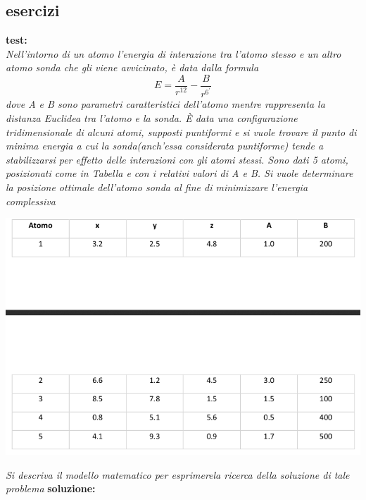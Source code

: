 \message{ !name(ro.tex)}\documentclass[a4paper,12pt, oneside]{book}
\begin{document}
\subsection{esercizi}
\begin{esempio}
  \textbf{test:}\\
  \textit{Nell’intorno di un atomo l’energia di interazione tra
    l’atomo stesso e un altro atomo sonda che gli viene avvicinato, è
    data dalla formula}
  \[E=\frac{A}{r^{12}}-\frac{B}{r^{6^{'}}}\]
  \textit{dove A e B sono parametri caratteristici dell’atomo mentre
    rappresenta la distanza Euclidea tra l’atomo e la sonda. È data
    una  configurazione  tridimensionale  di  alcuni  atomi,  supposti
    puntiformi  e  si  vuole  trovare  il  punto  di  minima energia
    a  cui  la  sonda(anch’essa considerata puntiforme) tende a
    stabilizzarsi per  effetto  delle  interazioni  con  gli atomi
    stessi. Sono  dati  5  atomi,  posizionati  come  in  Tabella
    e  con  i  relativi  valori  di  A  e  B.  Si  vuole  determinare
    la posizione ottimale dell’atomo sonda al fine di minimizzare
    l’energia complessiva}
  \begin{center}
    \includegraphics[scale = 0.7]{img/es.png}
  \end{center}
  \textit{Si descriva il modello matematico per esprimerela ricerca
    della soluzione di tale problema}
  \textbf{soluzione:}\\
  
\end{esempio}
\end{document}
